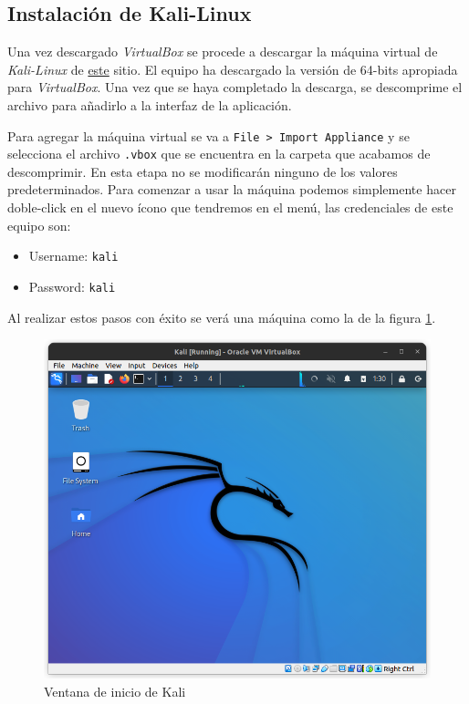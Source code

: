\documentclass{article}
\begin{document}
        \subsection{Instalación de Kali-Linux} \label{sec:kali-install}

            Una vez descargado \emph{VirtualBox} se procede a descargar la máquina virtual de \emph{Kali-Linux} de \href{https://www.kali.org/get-kali/#kali-virtual-machines}{este} sitio. El equipo ha descargado la versión de 64-bits apropiada para \emph{VirtualBox}. Una vez que se haya completado la descarga, se descomprime el archivo para añadirlo a la interfaz de la aplicación.

            Para agregar la máquina virtual se va a \texttt{File > Import Appliance} y se selecciona el archivo \texttt{.vbox} que se encuentra en la carpeta que acabamos de descomprimir. En esta etapa no se modificarán ninguno de los valores predeterminados. Para comenzar a usar la máquina podemos simplemente hacer doble-click en el nuevo ícono que tendremos en el menú, las credenciales de este equipo son:
            \begin{itemize}
                \item Username: \texttt{kali}
                \item Password: \texttt{kali}
            \end{itemize}

            Al realizar estos pasos con éxito se verá una máquina como la de la figura \ref{fig:kali-init}.
            \begin{figure}[!htbp]
                \centering
                \includegraphics[scale=0.25]{img/kali-screen.png}
                \caption{Ventana de inicio de Kali}
                \label{fig:kali-init}
            \end{figure}
\end{document}
